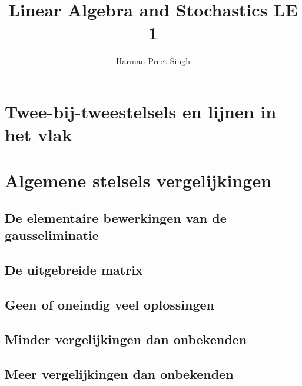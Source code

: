\documentclass[a4paper, 12pt]{article}
\title{Linear Algebra and Stochastics \textemdash{} LE 1}
\author{Harman Preet Singh}
\begin{document}

\maketitle
\tableofcontents

\section{Twee-bij-tweestelsels en lijnen in het vlak}

\section{Algemene stelsels vergelijkingen}
\subsection{De elementaire bewerkingen van de gausseliminatie}
\subsection{De uitgebreide matrix}
\subsection{Geen of oneindig veel oplossingen}
\subsection{Minder vergelijkingen dan onbekenden}
\subsection{Meer vergelijkingen dan onbekenden}
\end{document}
